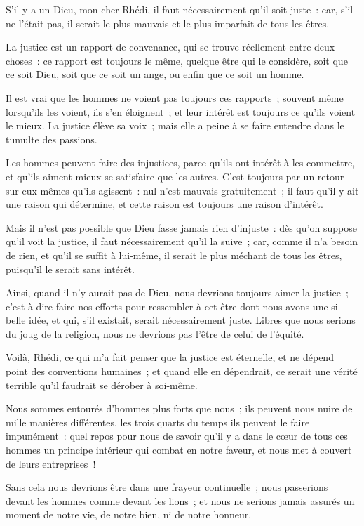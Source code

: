 \documentclass[french,twoside]{book} %
\begin{document}
\noindent S’il y a un Dieu, mon cher Rhédi, il faut nécessairement qu’il soit juste : car, s’il ne l’était pas, il serait le plus mauvais et le plus imparfait de tous les êtres.\par
La justice est un rapport de convenance, qui se trouve réellement entre deux choses : ce rapport est toujours le même, quelque être qui le considère, soit que ce soit Dieu, soit que ce soit un ange, ou enfin que ce soit un homme.\par
Il est vrai que les hommes ne voient pas toujours ces rapports ; souvent même lorsqu’ils les voient, ils s’en éloignent ; et leur intérêt est toujours ce qu’ils voient le mieux. La justice élève sa voix ; mais elle a peine à se faire entendre dans le tumulte des passions.\par
Les hommes peuvent faire des injustices, parce qu’ils ont intérêt à les commettre, et qu’ils aiment mieux se satisfaire que les autres. C’est toujours par un retour sur eux-mêmes qu’ils agissent : nul n’est mauvais gratuitement ; il faut qu’il y ait une raison qui détermine, et cette raison est toujours une raison d’intérêt.\par
Mais il n’est pas possible que Dieu fasse jamais rien d’injuste : dès qu’on suppose qu’il voit la justice, il faut nécessairement qu’il la suive ; car, comme il n’a besoin de rien, et qu’il se suffit à lui-même, il serait le plus méchant de tous les êtres, puisqu’il le serait sans intérêt.\par
Ainsi, quand il n’y aurait pas de Dieu, nous devrions toujours aimer la justice ; c’est-à-dire faire nos efforts pour ressembler à cet être dont nous avons une si belle idée, et qui, s’il existait, serait nécessairement juste. Libres que nous serions du joug de la religion, nous ne devrions pas l’être de celui de l’équité.\par
Voilà, Rhédi, ce qui m’a fait penser que la justice est éternelle, et ne dépend point des conventions humaines ; et quand elle en dépendrait, ce serait une vérité terrible qu’il faudrait se dérober à soi-même.\par
Nous sommes entourés d’hommes plus forts que nous ; ils peuvent nous nuire de mille manières différentes, les trois quarts du temps ils peuvent le faire impunément : quel repos pour nous de savoir qu’il y a dans le cœur de tous ces hommes un principe intérieur qui combat en notre faveur, et nous met à couvert de leurs entreprises !\par
Sans cela nous devrions être dans une frayeur continuelle ; nous passerions devant les hommes comme devant les lions ; et nous ne serions jamais assurés un moment de notre vie, de notre bien, ni de notre honneur.\par
\end{document}
